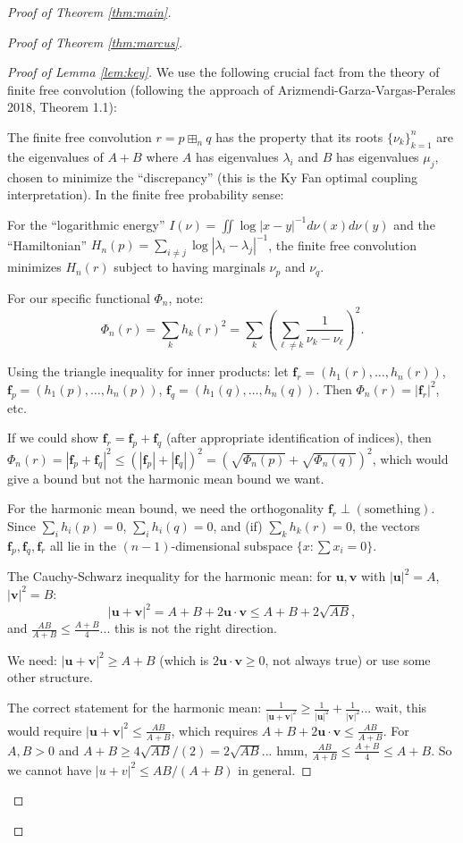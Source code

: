 \documentclass[12pt]{article}
\theoremstyle{definition}
\begin{document}
\begin{proof}[Proof of Theorem \ref{thm:main}]
\begin{proof}[Proof of Theorem \ref{thm:marcus}]
\begin{proof}[Proof of Lemma \ref{lem:key}]
We use the following crucial fact from the theory of finite free convolution (following the approach of Arizmendi-Garza-Vargas-Perales 2018, Theorem 1.1):

The finite free convolution $r = p\boxplus_n q$ has the property that its roots $\{\nu_k\}_{k=1}^n$ are the eigenvalues of $A+B$ where $A$ has eigenvalues $\lambda_i$ and $B$ has eigenvalues $\mu_j$, chosen to minimize the ``discrepancy'' (this is the Ky Fan optimal coupling interpretation). In the finite free probability sense:

For the ``logarithmic energy'' $I(\nu) = \iint\log|x-y|^{-1}d\nu(x)d\nu(y)$ and the ``Hamiltonian'' $H_n(p) = \sum_{i\neq j}\log|\lambda_i-\lambda_j|^{-1}$, the finite free convolution minimizes $H_n(r)$ subject to having marginals $\nu_p$ and $\nu_q$.

For our specific functional $\Phi_n$, note:
$$\Phi_n(r) = \sum_k h_k(r)^2 = \sum_k\left(\sum_{\ell\neq k}\frac{1}{\nu_k-\nu_\ell}\right)^2.$$

Using the triangle inequality for inner products: let $\mathbf{f}_r = (h_1(r),\ldots,h_n(r))$, $\mathbf{f}_p = (h_1(p),\ldots,h_n(p))$, $\mathbf{f}_q = (h_1(q),\ldots,h_n(q))$. Then $\Phi_n(r) = |\mathbf{f}_r|^2$, etc.

If we could show $\mathbf{f}_r = \mathbf{f}_p + \mathbf{f}_q$ (after appropriate identification of indices), then $\Phi_n(r) = |\mathbf{f}_p+\mathbf{f}_q|^2 \leq (|\mathbf{f}_p|+|\mathbf{f}_q|)^2 = (\sqrt{\Phi_n(p)}+\sqrt{\Phi_n(q)})^2$, which would give a bound but not the harmonic mean bound we want.

For the harmonic mean bound, we need the orthogonality $\mathbf{f}_r\perp(\text{something})$. Since $\sum_i h_i(p) = 0$, $\sum_i h_i(q) = 0$, and (if) $\sum_k h_k(r) = 0$, the vectors $\mathbf{f}_p, \mathbf{f}_q, \mathbf{f}_r$ all lie in the $(n-1)$-dimensional subspace $\{x:\sum x_i=0\}$.

The Cauchy-Schwarz inequality for the harmonic mean: for $\mathbf{u},\mathbf{v}$ with $|\mathbf{u}|^2 = A$, $|\mathbf{v}|^2=B$:
$$|\mathbf{u}+\mathbf{v}|^2 = A+B+2\mathbf{u}\cdot\mathbf{v} \leq A+B+2\sqrt{AB},$$
and $\frac{AB}{A+B}\leq\frac{A+B}{4}$... this is not the right direction.

We need: $|\mathbf{u}+\mathbf{v}|^2 \geq A+B$ (which is $2\mathbf{u}\cdot\mathbf{v}\geq 0$, not always true) or use some other structure.

The correct statement for the harmonic mean: $\frac{1}{|\mathbf{u}+\mathbf{v}|^2}\geq\frac{1}{|\mathbf{u}|^2}+\frac{1}{|\mathbf{v}|^2}$... wait, this would require $|\mathbf{u}+\mathbf{v}|^2 \leq \frac{AB}{A+B}$, which requires $A+B+2\mathbf{u}\cdot\mathbf{v}\leq\frac{AB}{A+B}$. For $A,B>0$ and $A+B\geq 4\sqrt{AB}/(2) = 2\sqrt{AB}$... hmm, $\frac{AB}{A+B}\leq\frac{A+B}{4}\leq A+B$. So we cannot have $|u+v|^2\leq AB/(A+B)$ in general.


\end{proof}
\end{proof}
\end{proof}
\end{document}
